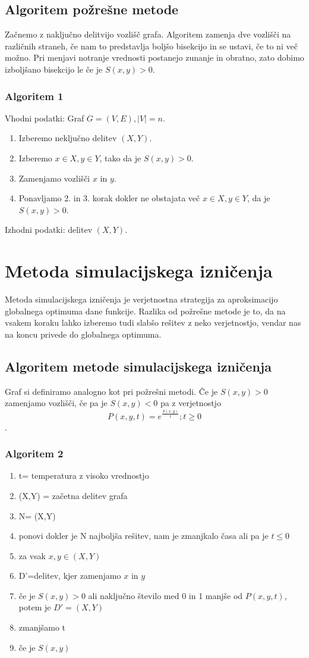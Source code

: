 \documentclass[12pt,a4paper]{amsart}
\theoremstyle{definition} %
\theoremstyle{plain} %
\begin{document}
\subsection{Algoritem požrešne metode}
Začnemo z naključno delitvijo vozlišč grafa. Algoritem zamenja dve vozlišči na različnih straneh, če nam to predstavlja boljšo bisekcijo in se ustavi, če to ni več možno. Pri menjavi notranje vrednosti postanejo zunanje in obratno, zato dobimo izboljšano bisekcijo le če je $S(x,y)>0$.
\subsubsection{Algoritem 1} 
Vhodni podatki: Graf $G=(V,E), |V|=n$.
\begin{enumerate}
\item Izberemo neključno delitev $(X,Y)$.
\item Izberemo $x\in X, y\in Y$, tako da je $S(x,y)>0$.
\item Zamenjamo vozlišči $x$ in $y$.
\item Ponavljamo 2. in 3. korak dokler ne obstajata več $x\in X, y\in Y$, da je $S(x,y)>0$.
\end{enumerate}
Izhodni podatki: delitev $(X,Y)$.

\section{Metoda simulacijskega izničenja}
Metoda simulacijskega izničenja je verjetnostna strategija za aproksimacijo globalnega optimuma dane funkcije. Razlika od požrešne metode je to, da na vsakem koraku lahko izberemo tudi slabšo rešitev z neko verjetnostjo, vendar nas na koncu privede do globalnega optimuma. 

\subsection{Algoritem metode simulacijskega izničenja}
Graf si definiramo analogno kot pri požrešni metodi. Če je $S(x,y)>0$ zamenjamo vozlišči, če pa je $S(x,y)<0$ pa z verjetnostjo $$P(x,y,t) = e^{\frac{S(x,y)}{t}}; t\ge 0$$.

\subsubsection{Algoritem 2}
\begin{enumerate}
\item t= temperatura z visoko vrednostjo
\item (X,Y) = začetna delitev grafa
\item N= (X,Y)
\item ponovi dokler je N najboljša rešitev, nam je zmanjkalo časa ali pa je $t \leq 0$
\item 		za vsak $x, y \in (X,Y)$
\item 			D'=delitev, kjer zamenjamo $x$ in $y$
\item 			če je $S(x,y) >0$ ali naključno število med 0 in 1 manjše od $P(x,y,t)$, potem je $D'=(X,Y)$
\item 			zmanjšamo t
\item 			če je $S(x,y)$		


\end{enumerate}
\end{document}
